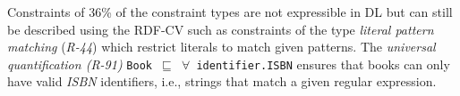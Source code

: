 \documentclass[a4paper,fontsize=11pt]{scrartcl}
\newcommand{\tb}[1]{\todo[size=\small, color=green!40]{\textbf{Thomas:} #1}}
\newcommand{\ms}[1]{\texttt{#1}}
\begin{document}
Constraints of 36\% of the constraint types are not expressible in DL but can still be described using the RDF-CV such as constraints of the type \emph{literal pattern matching} (\emph{R-44}) which restrict literals to match given patterns. The \emph{universal quantification (R-91)} {\small\ms{Book $\sqsubseteq$ $\forall$ identifier.ISBN}} ensures that books can only have valid \emph{ISBN} identifiers, i.e., strings that match a given regular expression.
%
\end{document}
